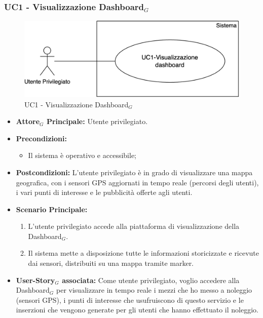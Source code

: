 \documentclass[11pt]{article}
\begin{document}
\begin{justify}
\subsubsection{\textbf{UC1 - Visualizzazione Dashboard$_G$}}
\begin{figure}[H]
    \centering
    \includegraphics[width=0.7\linewidth]{UC1image.png}
    \caption{UC1 - Visualizzazione Dashboard$_G$}
    \label{fig:UC1}
\end{figure}
\begin{itemize}
    \item \textbf{Attore$_G$ Principale:} Utente privilegiato.
    \item \textbf{Precondizioni:} 
        \begin{itemize}
          \item Il sistema è operativo e accessibile;
        \end{itemize}
    \item \textbf{Postcondizioni:} L'utente privilegiato è in grado di visualizzare una mappa geografica, con i sensori GPS aggiornati in tempo reale (percorsi degli utenti), i vari punti di interesse e le pubblicità offerte agli utenti.
    \item \textbf{Scenario Principale:}
        \begin{enumerate}
            \item L'utente privilegiato accede alla piattaforma di visualizzazione della Dashboard$_G$.
            \item Il sistema mette a disposizione tutte le informazioni storicizzate e ricevute dai sensori, distribuiti su una mappa tramite marker.
        \end{enumerate}
    \item \textbf{User-Story$_G$ associata:} Come utente privilegiato, voglio accedere alla Dashboard$_G$ per visualizzare in tempo reale i mezzi che ho messo a noleggio (sensori GPS), i punti di interesse che usufruiscono di questo servizio e le inserzioni che vengono generate per gli utenti che hanno effettuato il noleggio.
\end{itemize}



\end{justify}
\end{document}

